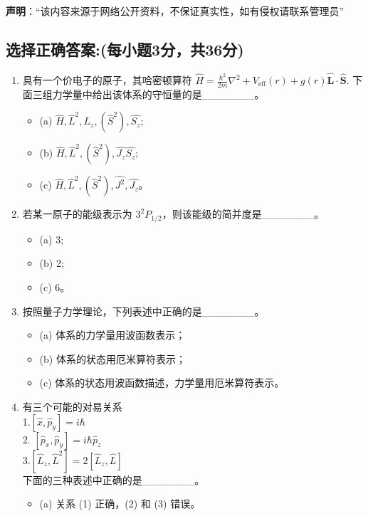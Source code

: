 
\textbf{声明}：“该内容来源于网络公开资料，不保证真实性，如有侵权请联系管理员”

\subsection{选择正确答案:(每小题3分，共36分)}
\begin{enumerate}
\item  具有一个价电子的原子，其哈密顿算符 $\hat{H} = \frac{\hbar^2}{2m} \nabla^2 + V_{\text{eff}}(r) + g(r) \mathbf{\hat L} \cdot \mathbf{\hat S}$. 下面三组力学量中给出该体系的守恒量的是_______。
    \begin{itemize}
        \item (a) $\hat{H}, \hat{L}^2, L_z, (\hat{S}^2), \hat{S_z}$;
        \item (b) $\hat{H}, \hat{L}^2, (\hat{S}^2), \hat{J_z}\hat{S_z}$;
        \item (c) $\hat{H}, \hat{L}^2, (\hat{S}^2), \hat{J^2},\hat{J_z}$。
    \end{itemize}
\item  若某一原子的能级表示为 $3^2P_{1/2}$，则该能级的简并度是_______。
 \begin{itemize}
        \item (a) 3;
        \item (b) 2;
        \item (c) 6。
    \end{itemize}
    \item 按照量子力学理论，下列表述中正确的是_______。
    \begin{itemize}
        \item (a) 体系的力学量用波函数表示；
        \item (b) 体系的状态用厄米算符表示；
        \item (c) 体系的状态用波函数描述，力学量用厄米算符表示。
    \end{itemize}
     \item 有三个可能的对易关系\\
     1.$[\hat{x}, \hat{p}_y] = i \hbar$\\
     2. $[\hat{p}_x, \hat{p}_y] = i \hbar \hat{p}_z$\\
     3.$[\hat{L}_z, \hat{L}^2] = 2[\hat{L}_z, \hat{L}]$\\
     下面的三种表述中正确的是_______。
     \begin{itemize}
        \item (a) 关系 (1) 正确，(2) 和 (3) 错误。

\end{itemize}
\end{enumerate}
